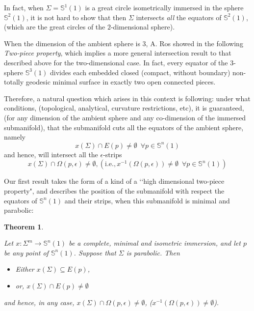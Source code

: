 \documentclass{amsart}
\newtheorem{theorem}{Theorem}[section]
\theoremstyle{definition}
\theoremstyle{remark}
\providecommand{\DIFadd}[1]{{\protect\color{blue}\uwave{#1}}} %
\providecommand{\DIFaddbegin}{} %
\providecommand{\DIFaddend}{} %
\begin{document}
     In fact, when $\Sigma=\mathbb{S}^{1}(1)$ is a great circle isometrically immersed in the sphere $\mathbb{S}^{2}(1)$, it is not hard to show that then $\Sigma$ intersects {\em all} the equators of $ \mathbb{S}^{2}(1)$, (which are the great circles of the $2$-dimensional sphere).

     When the dimension of the ambient sphere is $3$, A. Ros showed in \cite{R} the following {\em Two-piece property}, which implies a more general intersection result to that described above for the two-dimensional case. In fact, every equator of the 3-sphere $\mathbb{S}^3(1)$ divides each embedded closed (compact, without boundary) non-totally geodesic minimal surface in exactly two open connected pieces.

    
  Therefore,  a natural question which arises in this context is following: under what conditions, (topological, analytical, curvature restrictions, etc), it is guaranteed, (for any dimension of the ambient sphere and any co-dimension of the immersed submanifold), that the submanifold cuts all the equators of the ambient sphere, namely
        $$x(\Sigma) \cap E(p) \neq \emptyset\,\,\,\forall p \in \mathbb{S}^n(1)$$ and hence, will intersect all the $\epsilon$-strips
        $$x(\Sigma) \cap \Omega(p,\epsilon) \neq \emptyset, (\text{i.e.}, x^{-1}(\Omega(p,\epsilon))\neq \emptyset\,\,\,\forall p \in \mathbb{S}^n(1))$$

    Our first result  takes the form of a kind of a \lq\lq high dimensional two-piece property", and describes the position of the submanifold with respect the equators of $\mathbb{S}^n(1)$ and their strips, when this submanifold is minimal and parabolic:

\begin{theorem}\label{twopiecegeneral}

Let $x:\Sigma^m \to \mathbb{S}^n(1)$ be a complete,  minimal and isometric immersion, and let $p$ be any point of $\mathbb{S}^n(1)$. Suppose that $\Sigma$ is parabolic. Then
    \begin{itemize}
        \item Either $x(\Sigma)\subseteq E(p)$, 
        \item or, $x(\Sigma)\cap E(p)\neq \emptyset$
            \end{itemize}
            and  hence, in any case,  $x(\Sigma) \cap \Omega(p,\epsilon) \neq \emptyset$, (\DIFaddbegin \DIFadd{i.e. }\DIFaddend $x^{-1}(\Omega(p,\epsilon))\neq \emptyset$).
\end{theorem}
\end{document}
